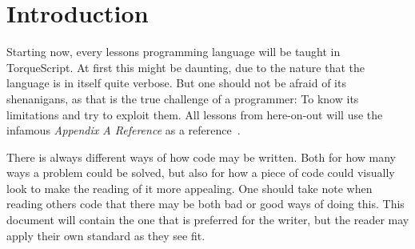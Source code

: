 \section{Introduction}

Starting now, every lessons programming language will be taught in TorqueScript. At first this might be daunting, due to the nature that the language is in itself quite verbose. But one should not be afraid of its shenanigans, as that is the true challenge of a programmer: To know its limitations and try to exploit them. All lessons from here-on-out will use the infamous \textit{Appendix A Reference} as a reference~\cite{tsappendix}.

There is always different ways of how code may be written. Both for how many ways a problem could be solved, but also for how a piece of code could visually look to make the reading of it more appealing. One should take note when reading others code that there may be both bad or good ways of doing this. This document will contain the one that is preferred for the writer, but the reader may apply their own standard as they see fit.


